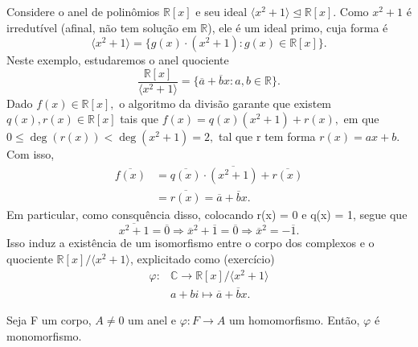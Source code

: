 \documentclass[algebraII_notes.tex]{subfiles}
\begin{document}
\begin{example}
	Considere o anel de polinômios \(\mathbb{R}[x]\) e seu ideal \(\langle x^{2}+1 \rangle\trianglelefteq \mathbb{R}[x]\).
	Como \(x^{2}+1\) é irredutível (afinal, não tem solução em \(\mathbb{R}\)), ele é um ideal primo, cuja forma é
	\[
		\langle x^{2}+1 \rangle = \{g(x)\cdot (x^{2}+1):g(x)\in \mathbb{R}[x]\}.
	\]
	Neste exemplo, estudaremos o anel quociente
	\[
		\frac{\mathbb{R}[x]}{\langle x^{2}+1 \rangle} = \{\overline{a} + \overline{b}x: a, b\in \mathbb{R}\}.
	\]
	Dado \(f(x)\in \mathbb{R}[x],\) o algoritmo da divisão garante que existem \(q(x), r(x)\in \mathbb{R}[x]\) tais que
	\(f(x) = q(x)(x^{2}+1) + r(x),\) em que \(0 \leq \deg{(r(x))} < \deg{(x^{2}+1)} = 2,\) tal que r tem forma \(r(x) = ax + b\).
	Com isso,
	\begin{align*}
		\overline{f(x)} & = \overline{q(x)}\cdot \overline{(x^{2}+1)} + \overline{r(x)} \\
		                & = \overline{r(x)} = \overline{a}+\overline{b}x.
	\end{align*}
	Em particular, como consquência disso, colocando r(x) = 0 e q(x) = 1, segue que
	\[
		\overline{x^{2}+1} = \overline{0} \Rightarrow \overline{x}^{2} + \overline{1} = \overline{0} \Rightarrow \overline{x}^{2} = -\overline{1}.
	\]
	Isso induz a existência de um isomorfismo entre o corpo dos complexos e o quociente \(\mathbb{R}[x]/\langle x^{2}+1 \rangle\), explicitado como (exercício)
	\begin{align*}
		\varphi : & \mathbb{C}\rightarrow \mathbb{R}[x]/\langle x^{2}+1 \rangle \\
		          & a + bi\mapsto \overline{a} + \overline{b}x.
	\end{align*}
\end{example}
\begin{prop*}[Exercício]
	Seja F um corpo, \(A\neq 0\) um anel e \(\varphi : F\rightarrow A\) um homomorfismo. Então, \(\varphi \) é monomorfismo.
\end{prop*}
\end{document}
